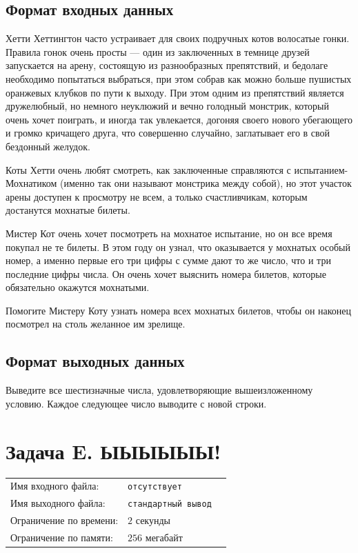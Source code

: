 \documentclass[12pt]{scrartcl}
\newcommand{\inputFile}{отсутствует}
\newcommand{\outputFile}{стандартный вывод}
\begin{document}
\subsection*{Формат входных данных}

Хетти Хеттингтон часто устраивает для своих подручных котов волосатые гонки. 
Правила гонок очень просты --- один из заключенных в темнице друзей запускается на арену, состоящую из разнообразных препятствий,
и бедолаге необходимо попытаться выбраться, при этом собрав как можно больше пушистых оранжевых клубков по пути к выходу. При этом одним из препятствий является дружелюбный, 
но немного неуклюжий и вечно голодный монстрик, который очень хочет поиграть, 
и иногда так увлекается, догоняя своего нового убегающего и громко кричащего друга, что совершенно случайно, заглатывает его в свой бездонный желудок. 


Коты Хетти очень любят смотреть, как заключенные
справляются с испытанием-Мохнатиком (именно так они называют монстрика между собой), но этот участок арены доступен к просмотру не всем, а только счастливчикам, 
которым достанутся мохнатые билеты. 

Мистер Кот очень хочет посмотреть на мохнатое испытание, но он все время покупал не те билеты. В этом году он узнал, 
что оказывается у мохнатых  особый номер, а именно первые его три цифры с сумме дают то же число, что и три последние цифры числа. Он очень хочет выяснить номера билетов, которые обязательно окажутся мохнатыми. 


Помогите Мистеру Коту узнать номера всех мохнатых билетов, чтобы он наконец посмотрел на столь желанное им зрелище. 


\subsection*{Формат выходных данных}

Выведите все шестизначные числа, удовлетворяющие вышеизложенному условию. Каждое следующее число выводите с новой строки.

\newpage


\section*{Задача E. ЫЫЫЫЫЫ!}

\begin{tabularx}{\textwidth}{l l X}
    Имя входного файла: & \texttt{\inputFile} \\
    Имя выходного файла: & \texttt{\outputFile} \\
    Ограничение по времени: & $2$ секунды \\
    Ограничение по памяти: & $256$ мегабайт \\
\end{tabularx}
\end{document}
